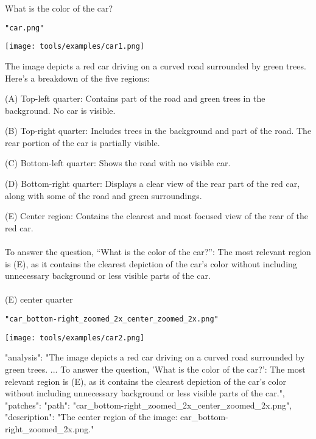 \begin{textcolorbox}
 What is the color of the car?

 \texttt{"car.png"}

\vspace{0.2cm}
\texttt{[image: tools/examples/car1.png]}
\vspace{0.2cm}


The image depicts a red car driving on a curved road surrounded by green trees. Here's a breakdown of the five regions:

\quad (A) Top-left quarter: Contains part of the road and green trees in the background. No car is visible.

\quad (B) Top-right quarter: Includes trees in the background and part of the road. The rear portion of the car is partially visible.

\quad (C) Bottom-left quarter: Shows the road with no visible car.

\quad (D) Bottom-right quarter: Displays a clear view of the rear part of the red car, along with some of the road and green surroundings.

\quad (E) Center region: Contains the clearest and most focused view of the rear of the red car.
\\\\
To answer the question, ``What is the color of the car?'': The most relevant region is (E), as it contains the clearest depiction of the car's color without including unnecessary background or less visible parts of the car.
\\\\
 (E) center quarter

 \texttt{"car\_bottom-right\_zoomed\_2x\_center\_zoomed\_2x.png"}

\vspace{0.2cm}
\texttt{[image: tools/examples/car2.png]}
\vspace{0.2cm}

\begin{codebox}
{
    "analysis": "The image depicts a red car driving on a curved road surrounded by green trees. ... To answer the question, 'What is the color of the car?': The most relevant region is (E), as it contains the clearest depiction of the car's color without including unnecessary background or less visible parts of the car.",
    "patches": 
     {
         "path": "car_bottom-right_zoomed_2x_center_zoomed_2x.png",
         "description": "The center region of the image: car_bottom-right_zoomed_2x.png."
     }
}
\end{codebox}

\end{textcolorbox}